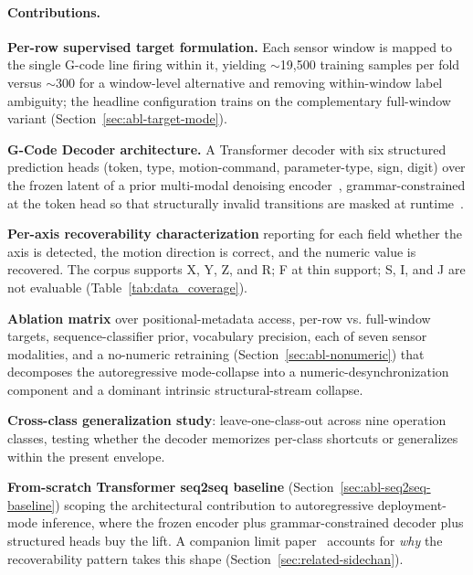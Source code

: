 \documentclass[sensors,article,submit,moreauthors,pdftex]{Definitions/mdpi}
\newcommand{\modelname}{G-Code Decoder}
\begin{document}
\paragraph{Contributions.}
\begin{enumerate}[label=\textbf{(\arabic*)}, leftmargin=*]\let\item\olditem
\item \textbf{Per-row supervised target formulation.} Each sensor window is mapped to the single G-code line firing within it, yielding $\sim$19{,}500 training samples per fold versus $\sim$300 for a window-level alternative and removing within-window label ambiguity; the headline configuration trains on the complementary full-window variant (Section~\ref{sec:abl-target-mode}).

\item \textbf{\modelname{} architecture.} A Transformer decoder with six structured prediction heads (token, type, motion-command, parameter-type, sign, digit) over the frozen latent of a prior multi-modal denoising encoder~\cite{encoder_paper}, grammar-constrained at the token head so that structurally invalid transitions are masked at runtime~\cite{picard,outlines,xgrammar}.

\item \textbf{Per-axis recoverability characterization} reporting for each field whether the axis is detected, the motion direction is correct, and the numeric value is recovered. The corpus supports X, Y, Z, and R; F at thin support; S, I, and J are not evaluable (Table~\ref{tab:data_coverage}).

\item \textbf{Ablation matrix} over positional-metadata access, per-row vs. full-window targets, sequence-classifier prior, vocabulary precision, each of seven sensor modalities, and a no-numeric retraining (Section~\ref{sec:abl-nonumeric}) that decomposes the autoregressive mode-collapse into a numeric-desynchronization component and a dominant intrinsic structural-stream collapse.

\item \textbf{Cross-class generalization study}: leave-one-class-out across nine operation classes, testing whether the decoder memorizes per-class shortcuts or generalizes within the present envelope.

\item \textbf{From-scratch Transformer seq2seq baseline} (Section~\ref{sec:abl-seq2seq-baseline}) scoping the architectural contribution to autoregressive deployment-mode inference, where the frozen encoder plus grammar-constrained decoder plus structured heads buy the lift. A companion limit paper~\cite{paperB_entropy} accounts for \emph{why} the recoverability pattern takes this shape (Section~\ref{sec:related-sidechan}).
\end{enumerate}
\end{document}
